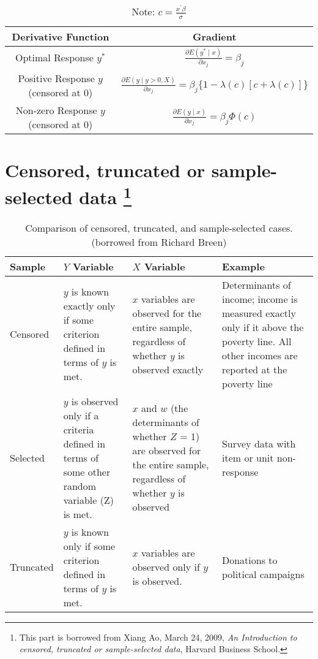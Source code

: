 \begin{table}[H]
    \centering
    \begin{tabular}{|c|c|}
    \hline
    \textbf{Derivative Function} & \textbf{Gradient} \\ \hline
    Optimal Response $y^*$       & $\frac{\partial E(y^* \mid x)}{\partial x_j} = \beta_j$ \\ \hline
    Positive Response $y$ (censored at 0) & $\frac{\partial E(y \mid y>0, X)}{\partial x_j} = \beta_j \{1 - \lambda(c)[c + \lambda(c)]\}$ \\ \hline
    Non-zero Response $y$ (censored at 0) & $\frac{\partial E(y \mid x)}{\partial x_j} = \beta_j \Phi(c)$ \\ \hline
    \end{tabular}
    \caption{Note: $c = \frac{x^{\prime}  \beta}{\sigma}$}
\end{table}

\pagebreak
\section{Censored, truncated or sample-selected data \protect\footnote{This part is borrowed from Xiang Ao, March 24, 2009, \textit{An Introduction to censored, truncated or sample-selected data}, Harvard Business School.}}
\begin{table}[H]
    \centering
    \caption{Comparison of censored, truncated, and sample-selected cases. (borrowed from Richard Breen)}
    \begin{tabular}{|>{\raggedright\arraybackslash}m{2cm}|>{\raggedright\arraybackslash}m{4cm}|>{\raggedright\arraybackslash}m{4cm}|>{\raggedright\arraybackslash}m{4cm}|}
    \hline
    \textbf{Sample} & \textbf{$Y$ Variable} & \textbf{$X$ Variable} & \textbf{Example} \\ \hline
    Censored & $y$ is known exactly only if some criterion defined in terms of $y$ is met. & $x$ variables are observed for the entire sample, regardless of whether $y$ is observed exactly & Determinants of income; income is measured exactly only if it above the poverty line. All other incomes are reported at the poverty line \\ \hline
    Selected & $y$ is observed only if a criteria defined in terms of some other random variable (Z) is met. & $x$ and $w$ (the determinants of whether $Z$ = 1) are observed for the entire sample, regardless of whether $y$ is observed & Survey data with item or unit non-response \\ \hline
    Truncated & $y$ is known only if some criterion defined in terms of $y$ is met. & $x$ variables are observed only if $y$ is observed. & Donations to political campaigns \\ \hline
    \end{tabular}
\end{table}

